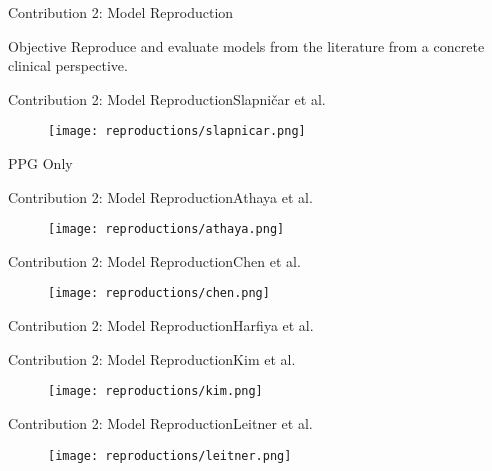 \begin{frame}{Contribution 2: Model Reproduction}
    \begin{block}{Objective}
        Reproduce and evaluate models from the literature from a concrete clinical perspective.
    \end{block}
\end{frame}

\begin{frame}{Contribution 2: Model Reproduction}{Slapničar et al.}
    \begin{figure}
        \texttt{[image: reproductions/slapnicar.png]}
    \end{figure}
    PPG Only
\end{frame}

\begin{frame}{Contribution 2: Model Reproduction}{Athaya et al.}
    \begin{figure}
        \texttt{[image: reproductions/athaya.png]}
    \end{figure}
\end{frame}

\begin{frame}{Contribution 2: Model Reproduction}{Chen et al.}
    \begin{figure}
        \texttt{[image: reproductions/chen.png]}
    \end{figure}
\end{frame}

\begin{frame}{Contribution 2: Model Reproduction}{Harfiya et al.}
    \begin{figure}
        
    \end{figure}
\end{frame}

\begin{frame}{Contribution 2: Model Reproduction}{Kim et al.}
    \begin{figure}
        \texttt{[image: reproductions/kim.png]}
    \end{figure}
\end{frame}

\begin{frame}{Contribution 2: Model Reproduction}{Leitner et al.}
    \begin{figure}
        \texttt{[image: reproductions/leitner.png]}
    \end{figure}
\end{frame}

